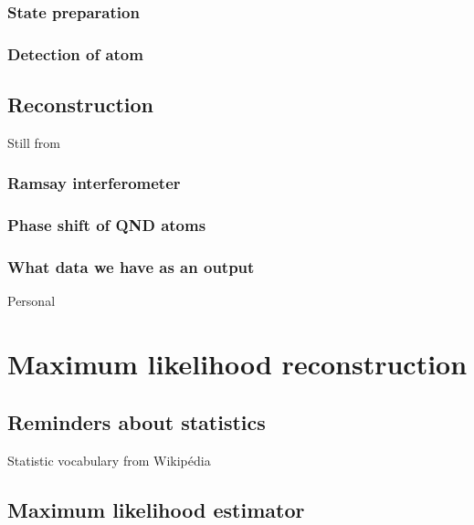 \documentclass[10pt]{report}
\begin{document}
\subsection{State preparation}


\subsection{Detection of atom}


\section{Reconstruction}

Still from \cite{Har06}

\subsection{Ramsay interferometer}

\subsection{Phase shift of QND atoms}

\subsection{What data we have as an output}

Personal





\chapter{Maximum likelihood reconstruction}
\section{Reminders about statistics}

Statistic vocabulary from Wikipédia

\section{Maximum likelihood estimator}
\end{document}
